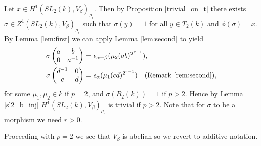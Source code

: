 Let $x\in H^1(SL_2(k), V_\beta)_{\rho_r}$. Then by Proposition \ref{trivial_on_t} there exists $\sigma \in Z^1(SL_2(k), V_\beta)_{\rho_r}$ such that $\sigma(y) = 1$ for all  $y\in T_2(k)$ and $\phi(\sigma) = x$. By Lemma \ref{lem:first} we can apply Lemma \ref{lem:second} to yield
\begin{align*}
\sigma\left(\begin{matrix}a & b\\0 & a^{-1}\end{matrix}\right) &= \epsilon_{\alpha+\beta}(\mu_2(ab)^{2^{r-1}}),\\
\sigma\left(\begin{matrix}d^{-1} & 0\\c & d\end{matrix}\right) &= \epsilon_{\alpha}(\mu_1(cd)^{2^{r-1}}) \quad\textrm{(Remark \ref{rem:second})},
\end{align*}
for some $\mu_1,\mu_2 \in k$ if $p = 2$, and $\sigma(B_2(k)) = 1$ if $p>2$. Hence by Lemma \ref{sl2_b_inj} $H^1(SL_2(k), V_\beta)_{\rho_r}$ is trivial if $p > 2$.
Note that for $\sigma$ to be a morphism we need $r>0$.

Proceeding with $p=2$ we see that $V_\beta$ is abelian so we revert to additive notation.

